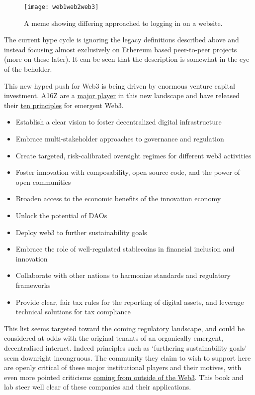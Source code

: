 \begin{figure}
  \centering
   \texttt{[image: web1web2web3]}
 \caption{A meme showing differing approached to logging in on a website.}
 \label{fig:web1web2web3}
\end{figure}
The current hype cycle is ignoring the legacy definitions described above and instead focusing almost exclusively on Ethereum based peer-to-peer projects (more on these later). It can be seen that the description is somewhat in the eye of the beholder.\par
This new hyped push for Web3 is being driven by enormous venture capital investment. A16Z are a \href{https://a16z.com/2022/01/07/9b-to-build-the-future/}{major player} in this new landscape and have released their \href{https://a16z.com/2022/01/07/how-to-build-a-better-internet-10-principles-for-world-leaders-shaping-the-future-of-web3/}{ten principles} for emergent Web3. 
\begin{itemize}
\item Establish a clear vision to foster decentralized digital infrastructure
\item Embrace multi-stakeholder approaches to governance and regulation
\item Create targeted, risk-calibrated oversight regimes for different web3 activities
\item Foster innovation with composability, open source code, and the power of open communities
\item Broaden access to the economic benefits of the innovation economy
\item Unlock the potential of DAOs
\item Deploy web3 to further sustainability goals
\item Embrace the role of well-regulated stablecoins in financial inclusion and innovation
\item Collaborate with other nations to harmonize standards and regulatory frameworks
\item Provide clear, fair tax rules for the reporting of digital assets, and leverage technical solutions for tax compliance
\end{itemize}
This list seems targeted toward the coming regulatory landscape, and could be considered at odds with the original tenants of an organically emergent, decentralised internet. Indeed principles such as `furthering sustainability goals' seem downright incongruous. The community they claim to wish to support here are openly critical of these major institutional players and their motives, with even more pointed criticisms \href{https://www.profgalloway.com/web3/}{coming from outside of the Web3}. This book and lab steer well clear of these companies and their applications.\par
